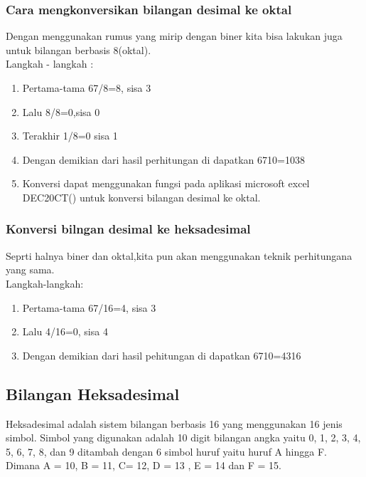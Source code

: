 \subsubsection{Cara mengkonversikan bilangan desimal ke oktal}
Dengan menggunakan rumus yang mirip dengan biner kita bisa lakukan juga untuk bilangan berbasis 8(oktal).
\\Langkah - langkah :
\begin{enumerate}
\item Pertama-tama 67/8=8, sisa 3
\item Lalu 8/8=0,sisa 0
\item Terakhir 1/8=0 sisa 1
\item Dengan demikian dari hasil perhitungan di dapatkan 6710=1038
\item Konversi dapat menggunakan fungsi pada aplikasi microsoft excel DEC20CT() untuk konversi bilangan desimal ke oktal.
\end{enumerate}

\subsubsection{Konversi bilngan desimal ke heksadesimal}
Seprti halnya biner dan oktal,kita pun akan menggunakan teknik perhitungana yang sama.\\

Langkah-langkah:
\begin{enumerate}

\item Pertama-tama 67/16=4, sisa 3
\item Lalu 4/16=0, sisa 4
\item Dengan demikian dari hasil pehitungan di dapatkan 6710=4316
\end{enumerate}

\subsection{Bilangan Heksadesimal}
Heksadesimal adalah sistem bilangan berbasis 16 yang menggunakan 16 jenis simbol. Simbol yang digunakan adalah 10 digit bilangan angka yaitu 0, 1, 2, 3, 4, 5, 6, 7, 8, dan 9 ditambah dengan 6 simbol huruf yaitu huruf A hingga F. Dimana A = 10, B = 11, C= 12, D = 13 , E = 14 dan F = 15.
